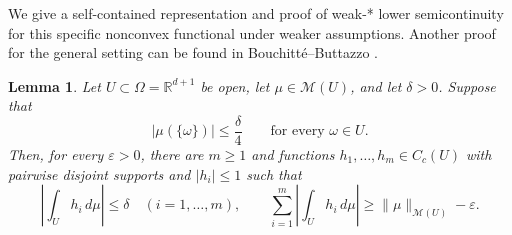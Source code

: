 \documentclass[11pt]{amsart}
\newtheorem{lemma}[theorem]{Lemma}
\theoremstyle{definition}
\theoremstyle{remark}
\begin{document}
We give a self-contained representation and proof of weak-* lower
semicontinuity for this specific nonconvex functional under weaker assumptions.
Another proof for the general setting can be found in Bouchitt\'e--Buttazzo
 \cite[Theorem~3.3 and Remark~3.5]{bouchitte1990new}.

\begin{lemma}
\label{lem:phi-coercivity}
Let $U\subset\Omega=\mathbb R^{d+1}$ be open, let
$\mu\in\mathcal M(U)$, and let $\delta>0$. Suppose that
\begin{equation*}
	|\mu(\{\omega\})|\le\frac{\delta}{4}
	\qquad\text{for every }\omega\in U.
\end{equation*}
Then, for every $\varepsilon>0$, there are $m\ge1$ and functions
$h_1,\ldots,h_m\in C_c(U)$ with pairwise disjoint supports and
$|h_i|\le1$ such that
\begin{equation*}
	\left|\int_U h_i\,d\mu\right|\le\delta
	\quad (i=1,\ldots,m),
	\qquad
	\sum_{i=1}^m\left|\int_U h_i\,d\mu\right|
	\ge\|\mu\|_{\mathcal M(U)}-\varepsilon.
\end{equation*}
\end{lemma}
\end{document}
